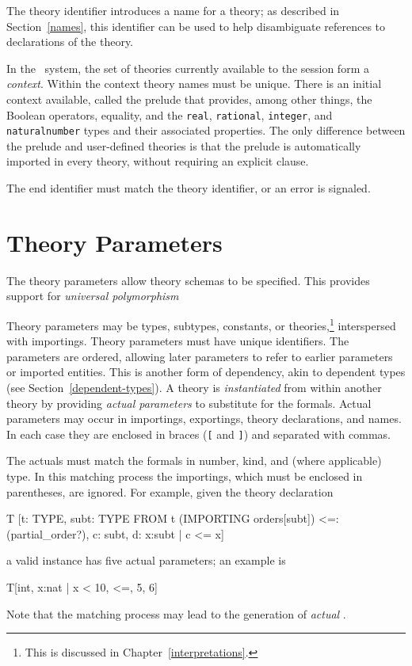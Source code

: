 The theory identifier introduces a name for a theory; as described in
Section~\ref{names}, this identifier can be used to help disambiguate
references to declarations of the theory.

In the \pvs\ system, the set of theories currently available to the
session form a \emph{context}.  Within the context theory names must be
unique.  There is an initial context available, called the prelude
that provides, among other things,
the Boolean operators, equality, and the \texttt{real}, \texttt{rational},
\texttt{integer}, and \texttt{naturalnumber} types and their associated
properties.  The only difference between the prelude and user-defined
theories is that the prelude is automatically imported in every theory,
without requiring an explicit  clause.

The end identifier must match the theory identifier, or an error is
signaled.


\section{Theory Parameters}\label{parameters}

The theory parameters allow theory schemas to be specified.  This
provides support for \emph{universal polymorphism}

Theory parameters may be types, subtypes, constants, or
theories,\footnote{This is discussed in Chapter~\ref{interpretations}.}
interspersed with importings.  Theory parameters must have unique
identifiers.  The parameters are ordered, allowing later parameters to
refer to earlier parameters or imported entities.  This is another form of
dependency, akin to dependent types (see Section~\ref{dependent-types}).
A theory is \emph{ instantiated} from within another theory by providing
\emph{actual parameters} to substitute for the
formals.  Actual parameters may occur in importings, exportings, theory
declarations, and names.  In each case they are enclosed in braces
(\texttt{[} and \texttt{]}) and separated with commas.

The actuals must match the formals in number, kind, and (where
applicable) type.  In this matching process the importings, which
must be enclosed in parentheses, are ignored.  For example, given the
theory declaration

\begin{pvsex}
  T [t: TYPE,
     subt: TYPE FROM t
     (IMPORTING orders[subt]) <=: (partial_order?),
     c: subt,
     d: \setb{}x:subt | c <= x\sete]
\end{pvsex}
a valid instance has five actual parameters; an example is
\begin{pvsex}
  T[int, \setb{}x:nat | x < 10\sete, <=, 5, 6]
\end{pvsex}
%
Note that the matching process may lead to the generation of \emph{actual}
\tccs.

